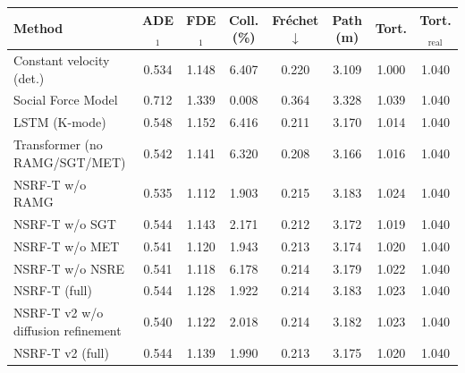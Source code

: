 \begin{tabular}{lccccccc}\toprule
Method & ADE$_1$ & FDE$_1$ & Coll. (\%) & Fr\'echet $\downarrow$ & Path (m) & Tort. & Tort.$_{\mathrm{real}}$ \\ \midrule
Constant velocity (det.) & 0.534 & 1.148 & 6.407 & 0.220 & 3.109 & 1.000 & 1.040 \\
Social Force Model & 0.712 & 1.339 & 0.008 & 0.364 & 3.328 & 1.039 & 1.040 \\
LSTM (K-mode) & 0.548 & 1.152 & 6.416 & 0.211 & 3.170 & 1.014 & 1.040 \\
Transformer (no RAMG/SGT/MET) & 0.542 & 1.141 & 6.320 & 0.208 & 3.166 & 1.016 & 1.040 \\
NSRF-T w/o RAMG & 0.535 & 1.112 & 1.903 & 0.215 & 3.183 & 1.024 & 1.040 \\
NSRF-T w/o SGT & 0.544 & 1.143 & 2.171 & 0.212 & 3.172 & 1.019 & 1.040 \\
NSRF-T w/o MET & 0.541 & 1.120 & 1.943 & 0.213 & 3.174 & 1.020 & 1.040 \\
NSRF-T w/o NSRE & 0.541 & 1.118 & 6.178 & 0.214 & 3.179 & 1.022 & 1.040 \\
NSRF-T (full) & 0.544 & 1.128 & 1.922 & 0.214 & 3.183 & 1.023 & 1.040 \\
NSRF-T v2 w/o diffusion refinement & 0.540 & 1.122 & 2.018 & 0.214 & 3.182 & 1.023 & 1.040 \\
NSRF-T v2 (full) & 0.544 & 1.139 & 1.990 & 0.213 & 3.175 & 1.020 & 1.040 \\
\bottomrule\end{tabular}